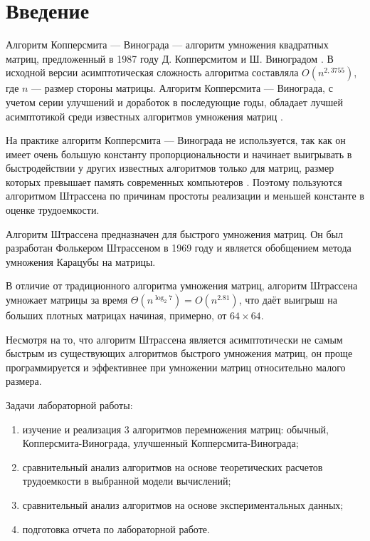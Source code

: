 \chapter*{Введение}

Алгоритм Копперсмита — Винограда — алгоритм умножения квадратных матриц, предложенный в 1987 году Д. Копперсмитом и Ш. Виноградом \cite{Coppersmith}.
В исходной версии асимптотическая сложность алгоритма составляла $O(n^{2,3755})$, где  $n$ — размер стороны матрицы.
Алгоритм Копперсмита — Винограда, с учетом серии улучшений и доработок в последующие годы, обладает лучшей асимптотикой среди известных алгоритмов умножения матриц \cite{Cohn}.

На практике алгоритм Копперсмита — Винограда не используется, так как он имеет очень большую константу пропорциональности и начинает выигрывать в быстродействии у других известных алгоритмов только для матриц, размер которых превышает память современных компьютеров \cite{Robinson}.
Поэтому пользуются алгоритмом Штрассена по причинам простоты реализации и меньшей константе в оценке трудоемкости.

Алгоритм Штрассена \cite{Strassen} предназначен для быстрого умножения матриц.
Он был разработан Фолькером Штрассеном в 1969 году и является обобщением метода умножения Карацубы на матрицы.

В отличие от традиционного алгоритма умножения матриц, алгоритм Штрассена умножает матрицы за время ${\displaystyle \Theta (n^{\log _{2}7})=O(n^{2.81})}$, что даёт выигрыш на больших плотных матрицах начиная, примерно, от $64\times64$.

Несмотря на то, что алгоритм Штрассена является асимптотически не самым быстрым из существующих алгоритмов быстрого умножения матриц, он проще программируется и эффективнее при умножении матриц относительно малого размера.

Задачи лабораторной работы:

\begin{enumerate}
	\item изучение и реализация 3 алгоритмов перемножения матриц: обычный, Копперсмита-Винограда, улучшенный Копперсмита-Винограда;
	\item сравнительный анализ алгоритмов на основе теоретических расчетов трудоемкости в выбранной модели вычислений;
	\item сравнительный анализ алгоритмов на основе экспериментальных данных;
    \item подготовка отчета по лабораторной работе.
\end{enumerate}

